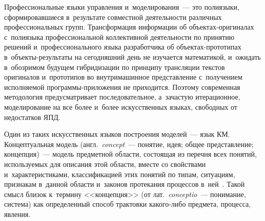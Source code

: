 \begin{multicols}{2}
  Профессиональные языки управления и~моделирования~--- это полиязыки, 
сформировавшиеся в~результате совместной деятельности различных профессиональных 
групп. Трансформация информации об объ\-ек\-тах-ори\-ги\-на\-лах с~полиязыка 
профессиональной коллективной деятельности по принятию решений и~профессионального 
языка разработчика об объ\-ек\-тах-про\-то\-ти\-пах в~объ\-ек\-ты-ре\-зуль\-та\-ты на сегодняшний 
день не изучается математикой, и~ожидать в~обозримом будущем гибри\-ди\-за\-ции по принципу 
трансляции текстов ори\-ги\-на\-лов и~прототипов во внутримашинное представление 
с~получением исполняемой про\-грам\-мы-при\-ло\-же\-ния не приходится. Поэтому 
современная методология предусматривает последовательное, а~зачастую итерационное, 
моделирование на все более и~более искусственных языках, свободных от недостатков ЯПД.
  
  Один из таких искусственных языков постро\-ения моделей~--- язык 
КМ. Концептуальная модель (англ.\ \textit{concept}~--- понятие, идея; общее 
представление; концепция)~--- модель предметной области, состоящая из перечня всех 
понятий, используемых для описания этой области, вместе со свойствами 
и~характеристиками, классификацией этих понятий по типам, ситуациям, признакам 
в~данной области и~законов протекания процессов в~ней~\cite{7-kir}. Такой смысл близок 
к~термину <<концепция>> (от лат.\ \textit{conceptio}~--- понимание, система) как 
определенный способ трактовки ка\-ко\-го-ли\-бо предмета, процесса, явления. 


\end{multicols}
